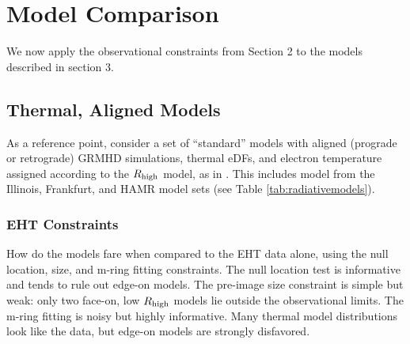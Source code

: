 \section{Model Comparison}\label{sec:comparisons}

We now apply the observational constraints from Section 2 to the models described in section 3.

\subsection{Thermal, Aligned Models}

As a reference point, consider a set of ``standard'' models with aligned (prograde or retrograde) GRMHD simulations, thermal eDFs, and electron temperature assigned according to the $R_\mathrm{high}$ model, as in .  This includes model from the Illinois, Frankfurt, and HAMR model sets (see Table \ref{tab:radiativemodels}).

\subsubsection{EHT Constraints}

How do the models fare when compared to the EHT data alone, using the null location, size, and m-ring fitting constraints.  The null location test is informative and tends to rule out edge-on models.  The pre-image size constraint is simple but weak: only two face-on, low $R_\mathrm{high}$ models lie outside the observational limits.   The m-ring fitting is noisy but highly informative.  Many thermal model distributions look like the data, but edge-on models are strongly disfavored.




